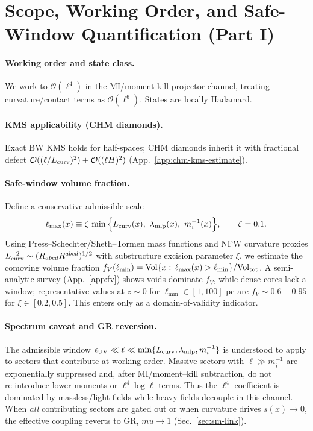 \documentclass[aps,prd,onecolumn,superscriptaddress,nofootinbib]{revtex4-2}
\def\mu{mu}%
\providecommand{\be}{\begin{equation}}
\providecommand{\ee}{\end{equation}}
\begin{document}
\section{Scope, Working Order, and Safe-Window Quantification (Part I)}
\label{sec:scope}

\paragraph{Working order and state class.} We work to \(\mathcal O(\ell^4)\) in the MI/moment-kill projector channel, treating curvature/contact terms as \(\mathcal O(\ell^6)\). States are locally Hadamard.

\paragraph{KMS applicability (CHM diamonds).} Exact BW KMS holds for half-spaces; CHM diamonds inherit it with fractional defect \(\mathcal O((\ell/L_{\rm curv})^2)+\mathcal O((\ell H)^2)\) (App.~\ref{app:chm-kms-estimate}).

\paragraph{Safe-window volume fraction.} Define a conservative admissible scale
\be
\label{eq:lmax}
\ell_{\max}(x)\equiv \zeta\,\min\Big\{L_{\rm curv}(x),\ \lambda_{\rm mfp}(x),\ m_i^{-1}(x)\Big\},\qquad \zeta=0.1.
\ee
Using Press–Schechter/Sheth–Tormen mass functions and NFW curvature proxies \(L_{\rm curv}^{-2}\sim (R_{abcd}R^{abcd})^{1/2}\) with substructure excision parameter \(\xi\), we estimate the comoving volume fraction \(f_V(\ell_{\min})=\mathrm{Vol}\{x:\,\ell_{\max}(x)>\ell_{\min}\}/\mathrm{Vol}_{\rm tot}\). A semi-analytic survey (App.~\ref{app:fv}) shows voids dominate \(f_V\), while dense cores lack a window; representative values at \(z\!\sim\!0\) for \(\ell_{\min}\in[1,100]\) pc are \(f_V\sim 0.6{-}0.95\) for \(\xi\in[0.2,0.5]\). This enters only as a domain-of-validity indicator.

\paragraph{Spectrum caveat and GR reversion.}
The admissible window \(\epsilon_{\rm UV}\ll \ell\ll\min\{L_{\rm curv},\lambda_{\rm mfp},m_i^{-1}\}\) is understood to apply to sectors that contribute at working order. Massive sectors with \(\ell\gg m_i^{-1}\) are exponentially suppressed and, after MI/moment–kill subtraction, do not re‑introduce lower moments or \(\ell^4\log\ell\) terms. Thus the \(\ell^4\) coefficient is dominated by massless/light fields while heavy fields decouple in this channel. When \emph{all} contributing sectors are gated out or when curvature drives \(s(x)\!\to\!0\), the effective coupling reverts to GR, \(\mu\!\to\!1\) (Sec.~\ref{sec:sm-link}).
\end{document}
